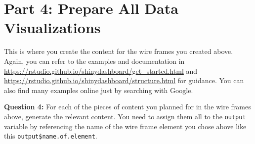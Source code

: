 \documentclass[
]{article}
\begin{document}
\section{Part 4: Prepare All Data
Visualizations}\label{part-4-prepare-all-data-visualizations}

This is where you create the content for the wire frames you created
above. Again, you can refer to the examples and documentation in
\url{https://rstudio.github.io/shinydashboard/get_started.html} and
\url{https://rstudio.github.io/shinydashboard/structure.html} for
guidance. You can also find many examples online just by searching with
Google.

\textbf{Question 4:} For each of the pieces of content you planned for
in the wire frames above, generate the relevant content. You need to
assign them all to the \texttt{output} variable by referencing the name
of the wire frame element you chose above like this
\texttt{output\$name.of.element}.
\end{document}
